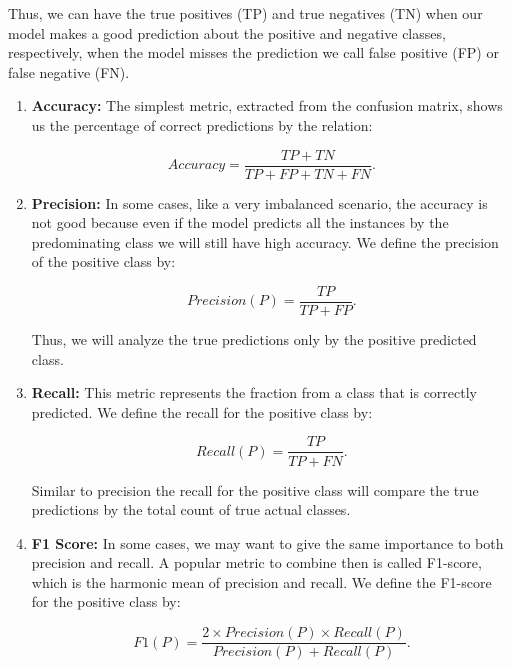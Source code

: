 	Thus, we can have the true positives (TP) and true negatives (TN) when our model makes a good prediction about the positive and negative classes, respectively, when the model misses the prediction we call false positive (FP) or false negative (FN). 
	
	\begin{enumerate}
		\item \textbf{Accuracy:} The simplest metric, extracted from the confusion matrix, shows us the percentage of correct predictions by the relation:
		
		\begin{equation}
			Accuracy = \frac{TP + TN}{TP + FP + TN + FN} \text{.}
		\end{equation}
		
		\item \textbf{Precision:} In some cases, like a very imbalanced scenario, the accuracy is not good because even if the model predicts all the instances by the predominating class we will still have high accuracy. We define the precision of the positive class by:
		
		\begin{equation}
			Precision(P) = \frac{TP}{TP + FP} \text{.}
		\end{equation}
	
		Thus, we will analyze the true predictions only by the positive predicted class.
		
		\item \textbf{Recall:} This metric represents the fraction from a class that is correctly predicted. We define the recall for the positive class by:
		
		\begin{equation}
			Recall(P) = \frac{TP}{TP + FN} \text{.}
		\end{equation}
		
		Similar to precision the recall for the positive class will compare the true predictions by the total count of true actual classes.
		
		\item \textbf{F1 Score:} In some cases, we may want to give the same importance to both precision and recall. A popular metric to combine then is called F1-score, which is the harmonic mean of precision and recall. We define the F1-score for the positive class by:
		
		\begin{equation}
			F1(P) = \frac{2 \times Precision(P) \times Recall(P)}{Precision(P) + Recall(P)} \text{.}
		\end{equation}
	
	\end{enumerate}
	
	